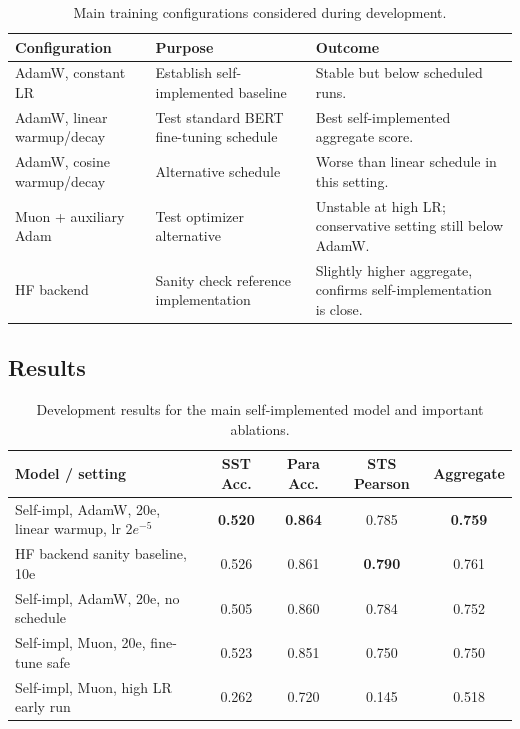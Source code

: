 \documentclass{article}
\begin{document}
\begin{table}[h]
\centering
\caption{Main training configurations considered during development.}
\begin{tabular}{p{}p{}p{}}
\toprule
Configuration & Purpose & Outcome \\
\midrule
AdamW, constant LR & Establish self-implemented baseline & Stable but below scheduled runs. \\
AdamW, linear warmup/decay & Test standard BERT fine-tuning schedule & Best self-implemented aggregate score. \\
AdamW, cosine warmup/decay & Alternative schedule & Worse than linear schedule in this setting. \\
Muon + auxiliary Adam & Test optimizer alternative & Unstable at high LR; conservative setting still below AdamW. \\
HF backend & Sanity check reference implementation & Slightly higher aggregate, confirms self-implementation is close. \\
\bottomrule
\end{tabular}
\label{tab:configs}
\end{table}

\subsection{Results}

\begin{table}[h]
\centering
\caption{Development results for the main self-implemented model and important ablations.}
\begin{tabular}{lcccc}
\toprule
Model / setting & SST Acc. & Para Acc. & STS Pearson & Aggregate \\
\midrule
Self-impl, AdamW, 20e, linear warmup, lr $2e^{-5}$ & \textbf{0.520} & \textbf{0.864} & 0.785 & \textbf{0.759} \\
HF backend sanity baseline, 10e & 0.526 & 0.861 & \textbf{0.790} & 0.761 \\
Self-impl, AdamW, 20e, no schedule & 0.505 & 0.860 & 0.784 & 0.752 \\
Self-impl, Muon, 20e, fine-tune safe & 0.523 & 0.851 & 0.750 & 0.750 \\
Self-impl, Muon, high LR early run & 0.262 & 0.720 & 0.145 & 0.518 \\
\bottomrule
\end{tabular}
\label{tab:main-results}
\end{table}
\end{document}
